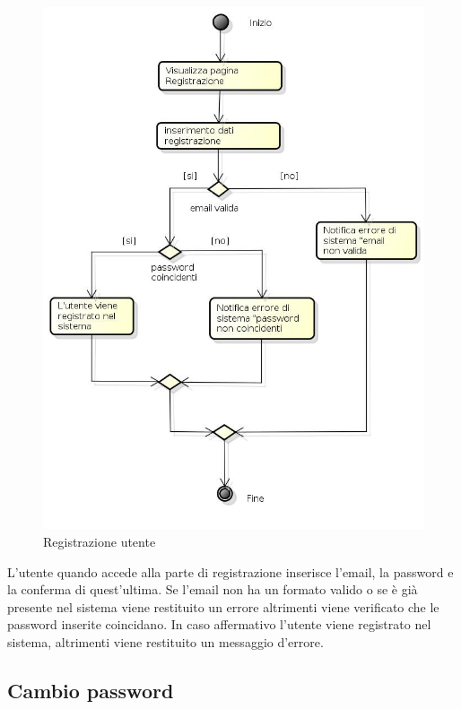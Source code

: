 \begin{figure}[h!]
		\centering
		\includegraphics[scale=.5]{img/Registrazione.jpg}
		\caption{Registrazione utente}
		\label{fig:Registrazione}
\end{figure}

L'utente quando accede alla parte di registrazione inserisce l'email, la password e la conferma di quest'ultima. Se l'email non ha un formato valido o se è già presente nel sistema viene restituito un errore altrimenti viene verificato che le password inserite coincidano. In caso affermativo l'utente viene registrato nel sistema, altrimenti viene restituito un messaggio d'errore.

\newpage

\subsection{Cambio password}

